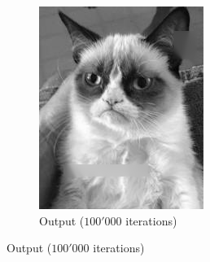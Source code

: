\documentclass{paper}
\begin{document}
\begin{figure}[ht]
\begin{subfigure}[ht]{0.45\textwidth}
	\includegraphics[width=\textwidth]{cat-iter100000-lambda1000-alpha0_0005}
	\caption*{Output ($100'000$ iterations)}
\end{subfigure}


\end{figure}
\end{document}

